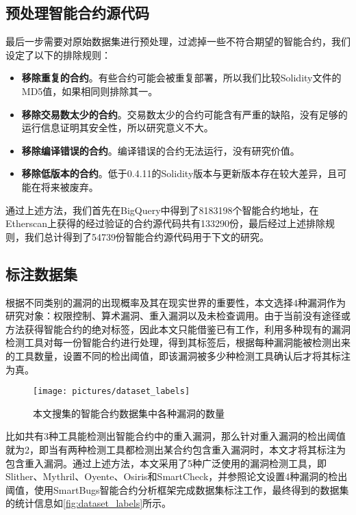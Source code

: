 \subsection{预处理智能合约源代码}
\label{sec:预处理智能合约源代码}

最后一步需要对原始数据集进行预处理，过滤掉一些不符合期望的智能合约，我们设定了以下的排除规则：
\begin{itemize}
    \item \textbf{移除重复的合约}。有些合约可能会被重复部署，所以我们比较Solidity文件的MD5值，如果相同则排除其一。
    \item \textbf{移除交易数太少的合约}。交易数太少的合约可能含有严重的缺陷，没有足够的运行信息证明其安全性，所以研究意义不大。
    \item \textbf{移除编译错误的合约}。编译错误的合约无法运行，没有研究价值。
    \item \textbf{移除低版本的合约}。低于0.4.11的Solidity版本与更新版本存在较大差异，且可能在将来被废弃。
\end{itemize}

通过上述方法，我们首先在BigQuery中得到了\num{8183198}个智能合约地址，在Etherscan上获得的经过验证的合约源代码共有\num{133290}份，最后经过上述排除规则，我们总计得到了\num{54739}份智能合约源代码用于下文的研究。
\subsection{标注数据集}
\label{sec:标注数据集}
根据不同类别的漏洞的出现概率及其在现实世界的重要性，本文选择4种漏洞作为研究对象：权限控制、算术漏洞、重入漏洞以及未检查调用。由于当前没有途径或方法获得智能合约的绝对标签，因此本文只能借鉴已有工作\cite{yashavant2022scrawld}，利用多种现有的漏洞检测工具对每一份智能合约进行处理，得到其标签后，根据每种漏洞能被检测出来的工具数量，设置不同的检出阈值，即该漏洞被多少种检测工具确认后才将其标注为真。
\begin{figure}[htbp]
    \centering
    \texttt{[image: pictures/dataset\_labels]}
    \caption{\label{fig:dataset_labels}本文搜集的智能合约数据集中各种漏洞的数量}
\end{figure}
比如共有3种工具能检测出智能合约中的重入漏洞，那么针对重入漏洞的检出阈值就为2，即当有两种检测工具都检测出某合约包含重入漏洞时，本文才将其标注为包含重入漏洞。通过上述方法，本文采用了5种广泛使用的漏洞检测工具，即Slither、Mythril、Oyente、Osiris和SmartCheck，并参照论文\cite{yashavant2022scrawld}设置4种漏洞的检出阈值，使用SmartBugs智能合约分析框架\cite{smartbugs}完成数据集标注工作，最终得到的数据集的统计信息如\autoref{fig:dataset_labels}所示。


